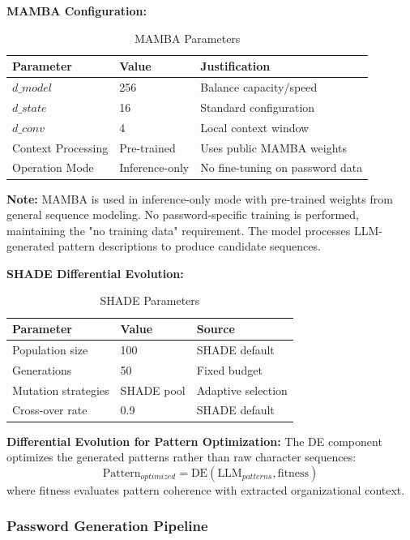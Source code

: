 \documentclass[preprint,12pt]{elsarticle}
\begin{document}
\textbf{MAMBA Configuration:}
\begin{table}[htbp]
\centering
\caption{MAMBA Parameters}
\label{tab:mamba}
\begin{tabular}{lll}
\toprule
\textbf{Parameter} & \textbf{Value} & \textbf{Justification} \\
\midrule
$d\_model$ & 256 & Balance capacity/speed \\
$d\_state$ & 16 & Standard configuration \\
$d\_conv$ & 4 & Local context window \\
Context Processing & Pre-trained & Uses public MAMBA weights \\
Operation Mode & Inference-only & No fine-tuning on password data \\
\bottomrule
\end{tabular}
\end{table}

\textbf{Note:} MAMBA is used in inference-only mode with pre-trained weights from general sequence modeling. No password-specific training is performed, maintaining the "no training data" requirement. The model processes LLM-generated pattern descriptions to produce candidate sequences.

\textbf{SHADE Differential Evolution:}
\begin{table}[htbp]
\centering
\caption{SHADE Parameters}
\label{tab:shade}
\begin{tabular}{lll}
\toprule
\textbf{Parameter} & \textbf{Value} & \textbf{Source} \\
\midrule
Population size & 100 & SHADE default \\
Generations & 50 & Fixed budget \\
Mutation strategies & SHADE pool & Adaptive selection \\
Cross-over rate & 0.9 & SHADE default \\
\bottomrule
\end{tabular}
\end{table}

\textbf{Differential Evolution for Pattern Optimization:}
The DE component optimizes the generated patterns rather than raw character sequences:
\begin{equation}
\text{Pattern}_{optimized} = \text{DE}(\text{LLM}_{patterns}, \text{fitness})
\end{equation}
where fitness evaluates pattern coherence with extracted organizational context.

\subsubsection{Password Generation Pipeline}
\end{document}
